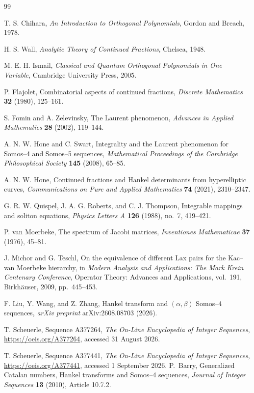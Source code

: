 \documentclass[11pt]{article}
\theoremstyle{remark}
\begin{document}
\begin{thebibliography}{99}

T. S. Chihara,
\emph{An Introduction to Orthogonal Polynomials},
Gordon and Breach, 1978.

H. S. Wall,
\emph{Analytic Theory of Continued Fractions},
Chelsea, 1948.

M. E. H. Ismail,
\emph{Classical and Quantum Orthogonal Polynomials in One Variable},
Cambridge University Press, 2005.

P. Flajolet,
Combinatorial aspects of continued fractions,
\emph{Discrete Mathematics} \textbf{32} (1980), 125--161.

S. Fomin and A. Zelevinsky,
The Laurent phenomenon,
\emph{Advances in Applied Mathematics} \textbf{28} (2002), 119--144.

A. N. W. Hone and C. Swart,
Integrality and the Laurent phenomenon for Somos--4 and Somos--5 sequences,
\emph{Mathematical Proceedings of the Cambridge Philosophical Society}
\textbf{145} (2008), 65--85.

A. N. W. Hone,
Continued fractions and Hankel determinants from hyperelliptic curves,
\emph{Communications on Pure and Applied Mathematics} \textbf{74} (2021), 2310--2347.

G. R. W. Quispel, J. A. G. Roberts, and C. J. Thompson,
Integrable mappings and soliton equations,
\emph{Physics Letters A} \textbf{126} (1988), no.~7, 419--421.

P. van Moerbeke,
The spectrum of Jacobi matrices,
\emph{Inventiones Mathematicae} \textbf{37} (1976), 45--81.

J. Michor and G. Teschl,
On the equivalence of different Lax pairs for the Kac--van Moerbeke hierarchy,
in \emph{Modern Analysis and Applications: The Mark Krein Centenary Conference},
Operator Theory: Advances and Applications, vol.~191,
Birkh\"auser, 2009, pp.~445--453.

F. Liu, Y. Wang, and Z. Zhang,
Hankel transform and $(\alpha,\beta)$ Somos--4 sequences,
\emph{arXiv preprint} arXiv:2608.08703 (2026).

T. Scheuerle,
Sequence A377264,
\emph{The On-Line Encyclopedia of Integer Sequences},
\url{https://oeis.org/A377264}, accessed 31 August 2026.

T. Scheuerle,
Sequence A377441,
\emph{The On-Line Encyclopedia of Integer Sequences},
\url{https://oeis.org/A377441}, accessed 1 September 2026.
P.~Barry,
\newblock Generalized Catalan numbers, Hankel transforms and Somos--4 sequences,
\newblock \emph{Journal of Integer Sequences} \textbf{13} (2010), Article 10.7.2.


\end{thebibliography}
\end{document}
